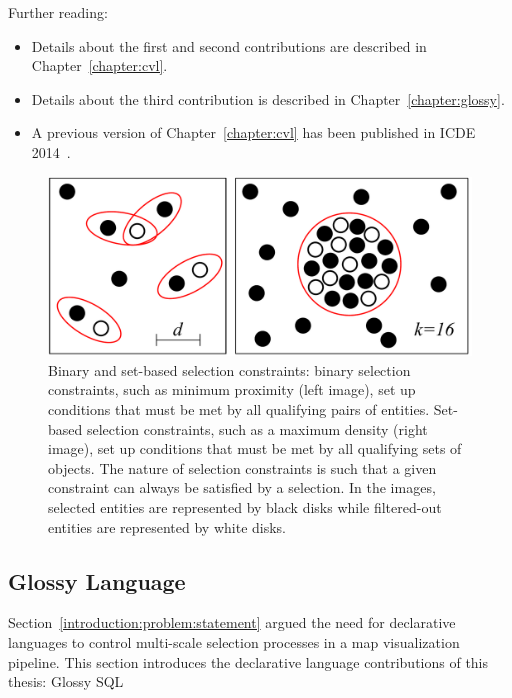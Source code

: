 \documentclass[11pt, oneside]{report}
\begin{document}
Further reading:
\vspace{-2ex}
\begin{itemize}
\item Details about the first and second contributions are described in Chapter~\ref{chapter:cvl}.
\item Details about the third contribution is described in Chapter~\ref{chapter:glossy}.
\item A previous version of Chapter~\ref{chapter:cvl} has been published in ICDE 2014~\cite{kefaloukos2014declarative}.
\end{itemize}

\begin{figure}[htbp]
\begin{center}
\includegraphics[scale=.35]{figs-thesis/holistic-selection.pdf}
\caption{Binary and set-based selection constraints: binary selection constraints, such as minimum proximity (left image), set up conditions that must be met by all qualifying pairs of entities. Set-based selection constraints, such as a maximum density (right image), set up conditions that must be met by all qualifying sets of objects. The nature of selection constraints is such that a given constraint can always be satisfied by a selection. In the images, selected entities are represented by black disks while filtered-out entities are represented by white disks.}
\label{fig:introduction:selection:constraints}
\end{center}
\vspace*{-4ex}
\end{figure}


\subsection{Glossy Language}
\label{sec:introduction:contributions:glossy}
Section~\ref{introduction:problem:statement} argued the need for declarative languages to control multi-scale selection processes in a map visualization pipeline. This section introduces the declarative language contributions of this thesis: Glossy SQL
\end{document}
